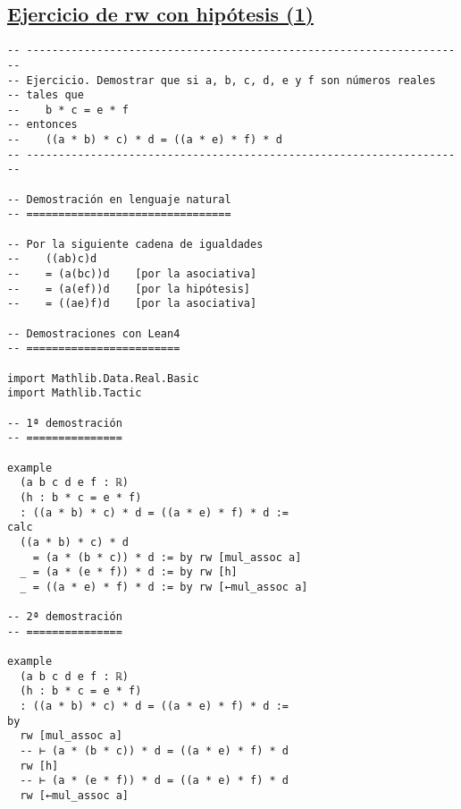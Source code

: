 \subsection{\href{./src/Basicos/Ejercicio\_de\_rw\_sobre\_hipotesis\_1.lean}{Ejercicio de rw con hipótesis (1)}}
\label{sec:orgb40f04b}
\begin{verbatim}
-- ---------------------------------------------------------------------
-- Ejercicio. Demostrar que si a, b, c, d, e y f son números reales
-- tales que
--    b * c = e * f
-- entonces
--    ((a * b) * c) * d = ((a * e) * f) * d
-- ---------------------------------------------------------------------

-- Demostración en lenguaje natural
-- ================================

-- Por la siguiente cadena de igualdades
--    ((ab)c)d
--    = (a(bc))d    [por la asociativa]
--    = (a(ef))d    [por la hipótesis]
--    = ((ae)f)d    [por la asociativa]

-- Demostraciones con Lean4
-- ========================

import Mathlib.Data.Real.Basic
import Mathlib.Tactic

-- 1ª demostración
-- ===============

example
  (a b c d e f : ℝ)
  (h : b * c = e * f)
  : ((a * b) * c) * d = ((a * e) * f) * d :=
calc
  ((a * b) * c) * d
    = (a * (b * c)) * d := by rw [mul_assoc a]
  _ = (a * (e * f)) * d := by rw [h]
  _ = ((a * e) * f) * d := by rw [←mul_assoc a]

-- 2ª demostración
-- ===============

example
  (a b c d e f : ℝ)
  (h : b * c = e * f)
  : ((a * b) * c) * d = ((a * e) * f) * d :=
by
  rw [mul_assoc a]
  -- ⊢ (a * (b * c)) * d = ((a * e) * f) * d
  rw [h]
  -- ⊢ (a * (e * f)) * d = ((a * e) * f) * d
  rw [←mul_assoc a]
\end{verbatim}

